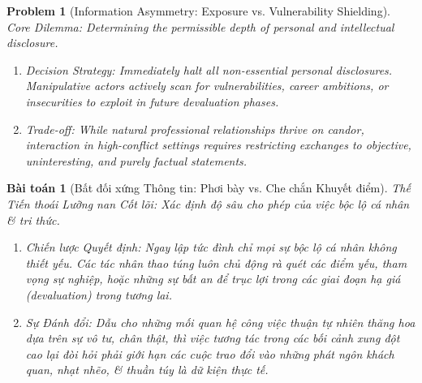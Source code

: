 \documentclass{article}
\newtheorem{problem}{Problem}
\newtheorem{baitoan}{Bài toán}
\begin{document}
\begin{problem}[Information Asymmetry: Exposure vs. Vulnerability Shielding]
	\emph{Core Dilemma:} Determining the permissible depth of personal and intellectual disclosure.
	\begin{enumerate}[label=(\roman*)]
		\item \emph{Decision Strategy:} Immediately halt all non-essential personal disclosures. Manipulative actors actively scan for vulnerabilities, career ambitions, or insecurities to exploit in future devaluation phases.
		\item \emph{Trade-off:} While natural professional relationships thrive on candor, interaction in high-conflict settings requires restricting exchanges to objective, uninteresting, and purely factual statements.
	\end{enumerate}
\end{problem}
\begin{baitoan}[Bất đối xứng Thông tin: Phơi bày vs. Che chắn Khuyết điểm]
	\emph{Thế Tiến thoái Lưỡng nan Cốt lõi:} Xác định độ sâu cho phép của việc bộc lộ cá nhân \& tri thức.
	\begin{enumerate}[label=(\roman*)]
		\item \emph{Chiến lược Quyết định:} Ngay lập tức đình chỉ mọi sự bộc lộ cá nhân không thiết yếu. Các tác nhân thao túng luôn chủ động rà quét các điểm yếu, tham vọng sự nghiệp, hoặc những sự bất an để trục lợi trong các giai đoạn hạ giá (devaluation) trong tương lai.
		\item \emph{Sự Đánh đổi:} Dẫu cho những mối quan hệ công việc thuận tự nhiên thăng hoa dựa trên sự vô tư, chân thật, thì việc tương tác trong các bối cảnh xung đột cao lại đòi hỏi phải giới hạn các cuộc trao đổi vào những phát ngôn khách quan, nhạt nhẽo, \& thuần túy là dữ kiện thực tế.
	\end{enumerate}
\end{baitoan}
\end{document}

